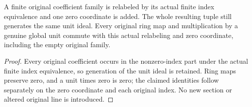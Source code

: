 \begin{lemma}
\label{lem:fc-original-generated-line-padded-coordinates}
\leanok
{}
A finite original coefficient family is relabeled by its actual
finite index equivalence and one zero coordinate is added. The
whole resulting tuple still generates the same unit ideal. Every
original ring map and multiplication by a genuine global unit
commute with this actual relabeling and zero coordinate, including
the empty original family.
\end{lemma}
\begin{proof}
Every original coefficient occurs in the nonzero-index part under
the actual finite index equivalence, so generation of the unit ideal
is retained. Ring maps preserve zero, and a unit times zero is zero;
the claimed identities follow separately on the zero coordinate
and each original index. No new section or altered original line
is introduced.
\end{proof}
